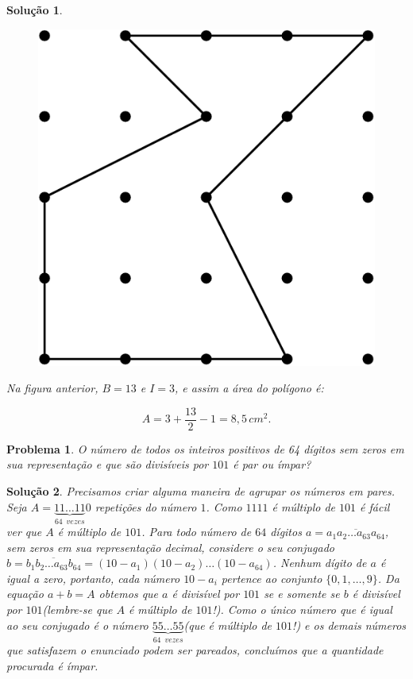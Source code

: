 \documentclass{hipatia}
\newtheorem{problem*}{Problema}
\newtheorem*{solution*}{Solução}
\begin{document}
\begin{solution*}
\begin{figure}[htbp]
	\centering
		\includegraphics[scale=0.3]{F58.png}
\end{figure} 

\noindent Na figura anterior, $B=13$ e $I=3$, e assim a área do polígono é:

$$A = 3 + \dfrac{13}{2}-1 = 8,5\,cm^2.$$ 

\end{solution*}


\begin{problem*}
O número de todos os inteiros positivos de 64 dígitos sem zeros em sua representação e que são divisíveis por $101$ é par ou ímpar?
\end{problem*}

\begin{solution*}
Precisamos criar alguma maneira de agrupar os números em pares. Seja $A = \underbrace{11 \ldots 11}_{64\,\,\, vezes}0$ repetições do número $1$. Como $1111$ é múltiplo de $101$ é fácil ver que  $A$ é múltiplo de $101$. Para todo número de $64$ dígitos $a=\overline{a_1a_2\ldots a_{63}a_{64}}$, sem zeros em sua representação decimal, considere o seu conjugado $b = \overline{b_1b_2\ldots a_{63}b_{64}} = (10-a_1)(10-a_2) \ldots (10-a_{64})$. Nenhum dígito de $a$ é igual a zero, portanto, cada número $10-a_i$ pertence ao conjunto $\{0,1,\ldots, 9\}$. Da equação $a+b=A$ obtemos que $a$ é divisível por $101$ se e somente se $b$ é divisível por $101$(lembre-se que $A$ é múltiplo de $101$!). Como o único número que é igual ao seu conjugado é o número $\underbrace{55 \ldots 55}_{64\,\,\, vezes}$(que é múltiplo de $101$!) e os demais números que satisfazem o enunciado podem ser pareados, concluímos que a quantidade procurada é ímpar.    
\end{solution*}
\end{document}
